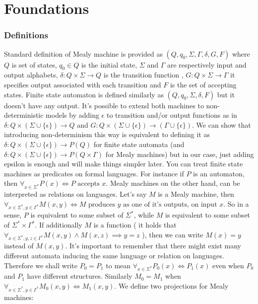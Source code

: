 \documentclass[12pt]{article}
\begin{document}
\maketitle
\lstset{
	basicstyle=\ttfamily,
	mathescape
}

\part{Foundations}
\section{Definitions}
Standard definition of Mealy machine is provided as $(Q,q_0,\Sigma,\Gamma,\delta,G,F)$ where $Q$ is set of states, $q_0 \in Q$ is the initial state, $\Sigma$ and $\Gamma$ are respectively input and output alphabets, $\delta: Q \times \Sigma \rightarrow Q$ is the transition function , $G: Q \times \Sigma \rightarrow \Gamma$ it specifies output associated with each transition and $F$ is the set of accepting states. Finite state automaton is defined similarly as $(Q,q_0,\Sigma,\delta, F)$ but it doesn't have any output. It's possible to extend both machines to non-deterministic models by adding $\epsilon$ to transition and/or output functions as in 
$\delta: Q \times (\Sigma \cup \{\epsilon\})\rightarrow Q$ and $G: Q \times (\Sigma \cup \{\epsilon\})\rightarrow (\Gamma \cup \{\epsilon\})$.  We can show that introducing non-determinism this way is equivalent to defining it as $\delta: Q \times (\Sigma \cup \{\epsilon\})\rightarrow P(Q)$ for finite state automata (and $\delta: Q \times (\Sigma \cup \{\epsilon\}) \rightarrow P(Q \times \Gamma)$ for Mealy machines) but in our case, just adding epsilon is enough and will make things simpler later. You can treat finite state machines as predicates on formal languages. For instance if $P$ is an automaton, then $\forall_{x\in \Sigma^*} P(x) \iff P \textrm{ accepts }x$. Mealy machines on the other hand, can be interpreted as relations on languages. Let's say $M$ is a Mealy machine, then $\forall_{x\in\Sigma^*, y \in \Gamma^*} M(x,y) \iff M \textrm{ produces } y \textrm{ as one of it's outputs, on input } x$. So in a sense, $P$ is equivalent to some subset of $\Sigma^*$, while $M$ is equivalent to some subset of $\Sigma^* \times \Gamma^*$. If additionally $M$ is a function ( it holds that $\forall_{x\in\Sigma^* , y,z \in \Gamma^* } M(x,y) \wedge M(x,z) \implies y=z$ ), then we can write $M(x)=y$ instead of $M(x,y)$. It's important to remember that there  might exist many different automata inducing the same language or relation on languages. Therefore we shall write $P_0 = P_1$ to mean $\forall_{x\in\Sigma^*} P_0(x) \iff P_1(x)$ even when $P_0$ and $P_1$ have different structures. Similarly $M_0 = M_1$ when $\forall_{x \in \Sigma^* , y\in\Gamma^*}M_0(x,y) \iff M_1(x,y)$.  We define two projections for Mealy machines: 
\end{document}

